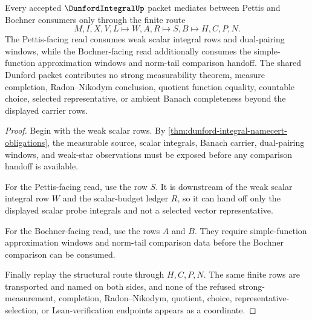 \begin{theorem}
\label{thm:dunford-integral-pettis-bochner-handoff}
Every accepted $\DunfordIntegralUp$ packet mediates between Pettis and Bochner consumers only through the finite route
$$
M,I,X,V,L \longmapsto W,A,R \longmapsto S,B \longmapsto H,C,P,N .
$$
The Pettis-facing read consumes weak scalar integral rows and dual-pairing windows, while the Bochner-facing read additionally consumes the simple-function approximation windows and norm-tail comparison handoff. The shared Dunford packet contributes no strong measurability theorem, measure completion, Radon--Nikodym conclusion, quotient function equality, countable choice, selected representative, or ambient Banach completeness beyond the displayed carrier rows.
\end{theorem}
\begin{proof}
Begin with the weak scalar rows. By \autoref{thm:dunford-integral-namecert-obligations}, the measurable source, scalar integrals, Banach carrier, dual-pairing windows, and weak-star observations must be exposed before any comparison handoff is available.

For the Pettis-facing read, use the row $S$. It is downstream of the weak scalar integral row $W$ and the scalar-budget ledger $R$, so it can hand off only the displayed scalar probe integrals and not a selected vector representative.

For the Bochner-facing read, use the rows $A$ and $B$. They require simple-function approximation windows and norm-tail comparison data before the Bochner comparison can be consumed.

Finally replay the structural route through $H,C,P,N$. The same finite rows are transported and named on both sides, and none of the refused strong-measurement, completion, Radon--Nikodym, quotient, choice, representative-selection, or Lean-verification endpoints appears as a coordinate.
\end{proof}


